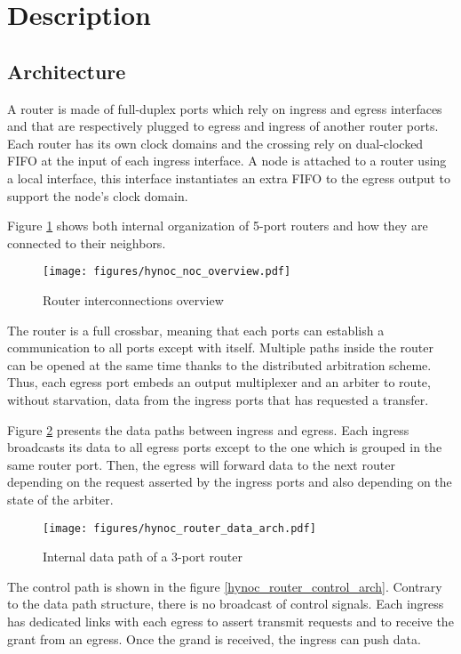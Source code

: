 \section{Description}
\subsection{Architecture}

A router is made of full-duplex ports which rely on ingress and egress interfaces and that are respectively plugged to
egress and ingress of another router ports. Each router has its own clock domains and the crossing rely on dual-clocked
FIFO at the input of each ingress interface. A node is attached to a router using a local interface, this interface
instantiates an extra FIFO to the egress output to support the node's clock domain.

Figure \ref{hynoc_noc_overview} shows both internal organization of 5-port routers and how they are connected to their
neighbors.

\begin{figure}[H]
  \centering
  \texttt{[image: figures/hynoc\_noc\_overview.pdf]}
  \caption{Router interconnections overview}
  \label{hynoc_noc_overview}
\end{figure}

The router is a full crossbar, meaning that each ports can establish a communication to all ports except with
itself. Multiple paths inside the router can be opened at the same time thanks to the distributed arbitration
scheme. Thus, each egress port embeds an output multiplexer and an arbiter to route, without starvation, data from the
ingress ports that has requested a transfer.

Figure \ref{hynoc_router_data_arch} presents the data paths between ingress and egress. Each ingress broadcasts its
data to all egress ports except to the one which is grouped in the same router port. Then, the egress will forward data
to the next router depending on the request asserted by the ingress ports and also depending on the state of the
arbiter.

\begin{figure}[H]
  \centering
  \texttt{[image: figures/hynoc\_router\_data\_arch.pdf]}
  \caption{Internal data path of a 3-port router}
  \label{hynoc_router_data_arch}
\end{figure}

The control path is shown in the figure \ref{hynoc_router_control_arch}. Contrary to the data path structure, there
is no broadcast of control signals. Each ingress has dedicated links with each egress to assert transmit requests and to
receive the grant from an egress. Once the grand is received, the ingress can push data.

